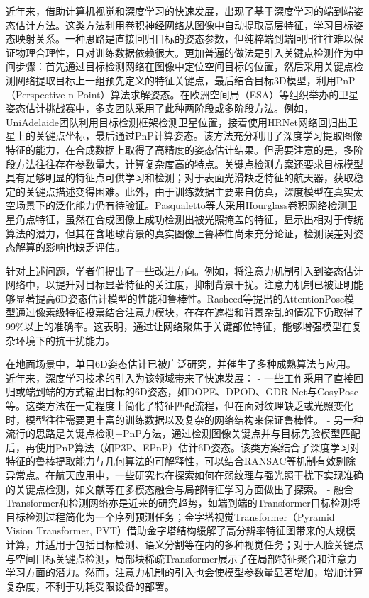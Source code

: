 近年来，借助计算机视觉和深度学习的快速发展，出现了基于深度学习的端到端姿态估计方法。这类方法利用卷积神经网络从图像中自动提取高层特征，学习目标姿态映射关系。一种思路是直接回归目标的姿态参数，但纯粹端到端回归往往难以保证物理合理性，且对训练数据依赖很大。更加普遍的做法是引入关键点检测作为中间步骤：首先通过目标检测网络在图像中定位空间目标的位置，然后采用关键点检测网络提取目标上一组预先定义的特征关键点，最后结合目标3D模型，利用PnP（Perspective-n-Point）算法求解姿态。在欧洲空间局（ESA）等组织举办的卫星姿态估计挑战赛中，多支团队采用了此种两阶段或多阶段方法。例如，UniAdelaide团队利用目标检测框架检测卫星位置，接着使用HRNet网络回归出卫星上的关键点坐标，最后通过PnP计算姿态\cite{chen2019satellite}。该方法充分利用了深度学习提取图像特征的能力，在合成数据上取得了高精度的姿态估计结果。但需要注意的是，多阶段方法往往存在参数量大，计算复杂度高的特点。关键点检测方案还要求目标模型具有足够明显的特征点可供学习和检测；对于表面光滑缺乏特征的航天器，获取稳定的关键点描述变得困难。此外，由于训练数据主要来自仿真，深度模型在真实太空场景下的泛化能力仍有待验证。Pasqualetto等人采用Hourglass卷积网络检测卫星角点特征，虽然在合成图像上成功检测出被光照掩盖的特征，显示出相对于传统算法的潜力，但其在含地球背景的真实图像上鲁棒性尚未充分论证，检测误差对姿态解算的影响也缺乏评估\cite{pclfrg}。

针对上述问题，学者们提出了一些改进方向。例如，将注意力机制引入到姿态估计网络中，以提升对目标显著特征的关注度，抑制背景干扰。注意力机制已被证明能够显著提高6D姿态估计模型的性能和鲁棒性。Rasheed等提出的AttentionPose模型通过像素级特征投票结合注意力模块，在存在遮挡和背景杂乱的情况下仍取得了99\%以上的准确率\cite{RasheedFarhanJasim+2023}。这表明，通过让网络聚焦于关键部位特征，能够增强模型在复杂环境下的抗干扰能力。

在地面场景中，单目6D姿态估计已被广泛研究，并催生了多种成熟算法与应用。近年来，深度学习技术的引入为该领域带来了快速发展：
- 一些工作采用了直接回归或端到端的方式输出目标的6D姿态，如DOPE\cite{Tekin2018DOPE}、DPOD\cite{Li2019DPOD}、GDR-Net\cite{Wang2021GDRNet}与CosyPose\cite{Peng2020CosyPose6D}等。这类方法在一定程度上简化了特征匹配流程，但在面对纹理缺乏或光照变化时，模型往往需要更丰富的训练数据以及复杂的网络结构来保证鲁棒性。
- 另一种流行的思路是关键点检测+PnP方法，通过检测图像关键点并与目标先验模型匹配后，再使用PnP算法（如P3P、EPnP）估计6D姿态。该类方案结合了深度学习对特征的鲁棒提取能力与几何算法的可解释性，可以结合RANSAC等机制有效剔除异常点。在航天应用中，一些研究也在探索如何在弱纹理与强光照干扰下实现准确的关键点检测，如文献\cite{Landrieu2018PointFusion, Simon2018BB8}等在多模态融合与局部特征学习方面做出了探索。
- 融合Transformer和检测网络亦是近来的研究趋势，如端到端的Transformer目标检测\cite{Carion2020EndToEnd}将目标检测过程简化为一个序列预测任务；金字塔视觉Transformer（Pyramid Vision Transformer, PVT）\cite{Wang2021PyramidVisionTransformer}借助金字塔结构缓解了高分辨率特征图带来的大规模计算，并适用于包括目标检测、语义分割等在内的多种视觉任务；对于人脸关键点与空间目标关键点检测，局部块稀疏Transformer\cite{Xia2022SparseLocalPatch}展示了在局部特征聚合和注意力学习方面的潜力。然而，注意力机制的引入也会使模型参数量显著增加，增加计算复杂度，不利于功耗受限设备的部署。

